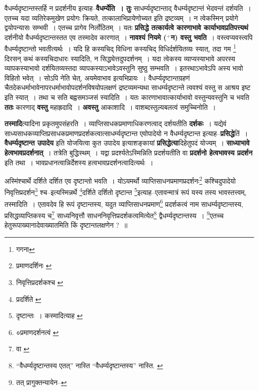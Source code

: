 \documentclass[article,12pt,a4paper]{memoir}
\newcommand{\add}[1]{($^{+}$#1)}
\begin{document}
	  \pstart वैधर्म्यदृष्टान्तस्तर्हि न प्रदर्शनीय इत्याह--\textbf{वैधर्म्येति । तुः} साधर्म्यदृष्टान्ताद् वैधर्म्यदृष्टान्तं भेदवन्तं दर्शयति । एतच्च यदा व्यतिरेकमुखेण प्रयोगः क्रियते, तत्कालाभिप्रायेणोच्यत इति द्रष्टव्यम् । न त्वेकस्मिन् प्रयोगे द्वयोपन्यासः सम्भवी । एतच्च प्रागेव निर्लोठितम् । यतः \textbf{प्रसिद्धे तत्कार्यत्वे कारणाभावे कार्याभावप्रतिपत्त्यथं} दर्शनीयो वैधर्म्यदृष्टान्तस्तत एव तस्मादेव कारणात् । \textbf{नावश्यं नियमे \add{न} वस्तु भवति} । वस्त्वप्यवस्त्वपि वैधर्म्यदृष्टान्तो भवतीत्यर्थः । यदि हि कस्यचिद् विधिना कस्यचिद् विधिर्दर्शयितव्यः स्यात्, तदा गम \footnote{गगना} दिरसन् कथं कस्यचिदाधारः स्यादिति, न सिद्ध्येत्तदुपदर्शनम् । यदा त्वेकस्य व्याप्यस्याभावे अपरस्य व्यापकस्याभावो दर्शयितव्यस्तदा व्यापकस्याऽभावेऽवस्तुनि सुष्ठु सम्भवति । इतरथाऽभावेऽपि अस्य भावो विहितो भवेत् । सोऽपि नेति चेत्, अयमेवाभाव इत्यभिप्रायः । वैधर्म्यदृष्टान्तग्रहणं चैतदेकधर्माभावेनापरधर्माभावोपदर्शनविषयोपलक्षणं द्रष्टव्यमन्यथा साधर्म्यदृष्टान्ते त्ववश्यं वस्तु स आश्रय इष्ट इति स्यात् । तथा च सति बह्वसमञ्जसं स्यादिति । यतः कारणाभावात्कार्याभावो वस्तुन्यवस्तुनि च भवति \textbf{ततः} कारणाद् \textbf{वस्तु} महाह्रदादि । \textbf{अवस्तु} आकाशादि । वाशब्दस्तुल्यबलत्वं समुच्चिनोति ।
	\pend
      

	  \pstart \textbf{तस्मादि}त्यादिना प्रकृतमुपसंहरति । व्याप्तिसाधकप्रमाणाधिकरणत्वाद् दर्शयतीति \textbf{दर्शकः} । यद्येवं साध्यसाधकव्याप्तिप्रसाधकप्रमाणप्रदर्शकत्वात्साधर्म्यदृष्टान्त एवोपादेयो न वैधर्म्यदृष्टान्त इत्याह--\textbf{प्रसिद्धे}तिं । \textbf{वैधर्म्यदृष्टान्त उपादेय} इति योजयित्वा कुत उपादेय इत्याशङ्कायां \textbf{प्रसिद्धेत्या}दिहेतुपदं योज्यम् । \textbf{साध्याभावे हेत्वभावप्रदर्शनात्} । तत्रेति बुद्धिस्थम् । यद्वा प्रदर्श्यतेऽस्मिन्निति प्रदर्शयतीति वा \textbf{प्रदर्शनो हेत्वभावस्य प्रदर्शन} इति तथा । भावप्रधानत्वान्निर्देशस्य हत्वभावप्रदर्शनत्वादित्यर्थः ।
	\pend
      \leavevmode{}
	  \bigskip
	  \begingroup
	

	  \pstart अस्मिंश्चार्थे दर्शिते दर्शित एव दृष्टान्तो भवति । योऽयमर्थो व्याप्तिसाधनप्रमाणप्रदर्शनः\footnote{प्रमाणदर्शिनः \cite{dp-msA} \cite{dp-msB} \cite{dp-edP} \cite{dp-edH} \cite{dp-edN}} कश्चिदुपादेयो निवृत्तिप्रदर्शन\footnote{निवृत्तिप्रदर्शकश्च \cite{dp-msB}} श्च--इत्यस्मिन्नर्थे \footnote{प्रदर्शिते \cite{dp-msA} \cite{dp-edP} \cite{dp-edH} \cite{dp-edE} \cite{dp-edN}}दर्शिते दर्शितो दृष्टान्त \footnote{दृष्टान्तः । कस्मादित्याह \cite{dp-edE}}इत्याह--एतावन्मात्रं रूपं यस्य तस्य भावस्तत्त्वम्, तस्मादिति । एतावदेव हि रूपं दृष्टान्तस्य, यदुत व्याप्तिसाधनप्रमाण\footnote{०प्रमाणदर्शनत्वं \cite{dp-msA} \cite{dp-msB} \cite{dp-msD} \cite{dp-edP} \cite{dp-edH} \cite{dp-edE}} प्रदर्शकत्वं नाम साधर्म्यदृष्टान्तस्य, प्रसिद्धव्याप्तिकस्य च\footnote{वा \cite{dp-msA} \cite{dp-msB} \cite{dp-msD} \cite{dp-edP} \cite{dp-edH} \cite{dp-edE} \cite{dp-edN}} साध्यनिवृत्तौ साधननिवृत्तिप्रदर्शकत्वमित्येत\footnote{“वैधर्म्यदृष्टान्तस्य एतत्” नास्ति \cite{dp-msB} “वैधर्म्यदृष्टान्तस्य” नास्ति. \cite{dp-msD}} द्वैधर्म्यदृष्टान्तस्य । \footnote{तत् \cite{dp-msA} \cite{dp-msD} \cite{dp-edP} \cite{dp-edH} \cite{dp-edE} \cite{dp-edN} प्रागुक्तन्यायेन--\cite{dp-msD-n}}एतच्च हेतुरूपाख्यानादेवाख्यातमिति किं दृष्टान्तलक्षणेन ? ॥
	\pend
       
\end{document}
